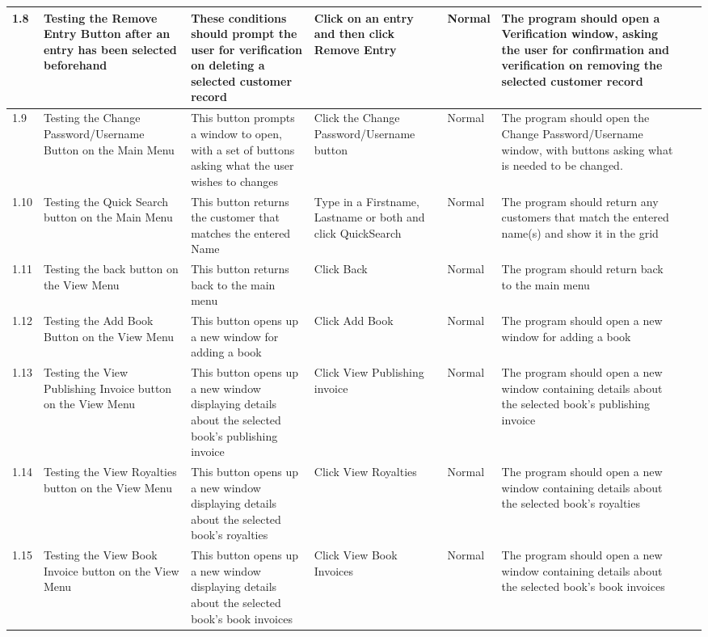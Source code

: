 \begin{landscape}
\begin{center}
\begin{longtable}{|p{1.5cm}|p{2cm}|p{2.5cm}|p{2.5cm}|p{2cm}|p{2cm}|p{2cm}|p{2cm}|}
        1.8 & Testing the Remove Entry Button after an entry has been selected beforehand & These conditions should prompt the user for verification on deleting a selected customer record & Click on an entry and then click Remove Entry & Normal & The program should open a
Verification window, asking the user for confirmation and verification on removing the selected customer record & & \\ \hline
        1.9 & Testing the Change Password/Username Button on the Main Menu & This button prompts a window to open, with a set of buttons asking what the user wishes to changes & Click the Change Password/Username button & Normal & The program should open the Change Password/Username window, with buttons asking what is needed to be changed. & & \\ \hline
\rowcolor{lightgray} 1.10 & Testing the Quick Search button on the Main Menu & This button returns the customer that matches the entered Name & Type in a Firstname, Lastname or both and click QuickSearch & Normal & The program should return any customers that match the entered name(s) and show it in the grid & & \\ \hline
        1.11 & Testing the back button on the View Menu & This button returns back to the main menu & Click Back & Normal & The program should return back to the main menu & & \\ \hline
        1.12 & Testing the Add Book Button on the View Menu & This button opens up a new window for adding a book & Click Add Book & Normal & The program should open a new window for adding a book & & \\ \hline
        1.13 & Testing the View Publishing Invoice button on the View Menu & This button opens up a new window displaying details about the selected book's publishing invoice & Click View Publishing invoice & Normal & The program should open a new window containing details about the selected book's publishing invoice & & \\ \hline
        1.14 & Testing the View Royalties button on the View Menu & This button opens up a new window displaying details about the selected book's royalties & Click View Royalties & Normal & The program should open a new window containing details about the selected book's royalties & & \\ \hline
        1.15 & Testing the View Book Invoice button on the View Menu & This button opens up a new window displaying details about the selected book's book invoices & Click View Book Invoices & Normal & The program should open a new window containing details about the selected book's book invoices & & \\ \hline

\end{longtable}
\end{center}
\end{landscape}
